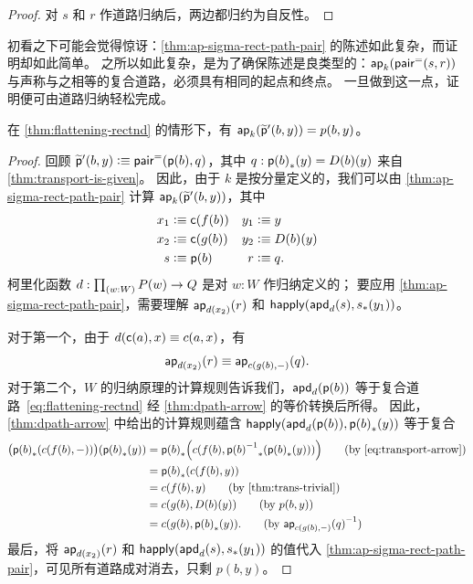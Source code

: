 \begin{proof}
  对 $s$ 和 $r$ 作道路归纳后，两边都归约为自反性。
\end{proof}

初看之下可能会觉得惊讶：\cref{thm:ap-sigma-rect-path-pair} 的陈述如此复杂，而证明却如此简单。
之所以如此复杂，是为了确保陈述是良类型的：$\mathsf{ap}_{k} (\mathsf{pair}^{\mathord{=}}(s,r))$ 与声称与之相等的复合道路，必须具有相同的起点和终点。
一旦做到这一点，证明便可由道路归纳轻松完成。

\begin{lem}\label{thm:flattening-rectnd-beta-ppt}
  在 \cref{thm:flattening-rectnd} 的情形下，有 $\mathsf{ap}_{k}(\widetilde{\mathsf{p}}'(b,y)) = p(b,y)$。
\end{lem}

\begin{proof}
  回顾 $\widetilde{\mathsf{p}}'(b,y) \vcentcolon\equiv \mathsf{pair}^{\mathord{=}}(\mathsf{p}(b),q)$，其中 $q:{\mathsf{p}(b)}_{*}\mathopen{}\left({y}\right)\mathclose{} = D(b)(y)$ 来自 \cref{thm:transport-is-given}。
  因此，由于 $k$ 是按分量定义的，我们可以由 \cref{thm:ap-sigma-rect-path-pair} 计算 $\mathsf{ap}_{k}(\widetilde{\mathsf{p}}'(b,y))$，其中
  \begin{align*}
    x_1 &\vcentcolon\equiv \mathsf{c}(f(b)) & y_1 &\vcentcolon\equiv y\\
    x_2 &\vcentcolon\equiv \mathsf{c}(g(b)) & y_2 &\vcentcolon\equiv D(b)(y)\\
    s &\vcentcolon\equiv \mathsf{p}(b)      &   r &\vcentcolon\equiv q.
  \end{align*}
  柯里化函数 $d:\prd{w:W} P(w) \to Q$ 是对 $w:W$ 作归纳定义的；
  要应用 \cref{thm:ap-sigma-rect-path-pair}，需要理解 $\mathsf{ap}_{d(x_2)}(r)$ 和 $\mathsf{happly}(\mathsf{apd}_{d}(s),{s}_{*}\mathopen{}\left({y_1}\right)\mathclose{})$。

  对于第一个，由于 $d(\mathsf{c}(a),x)\equiv c(a,x)$，有
  \[ \mathsf{ap}_{d(x_2)}(r) \equiv \mathsf{ap}_{c(g(b),-)}(q). \]
  对于第二个，$W$ 的归纳原理的计算规则告诉我们，$\mathsf{apd}_{d}(\mathsf{p}(b))$ 等于复合道路~\eqref{eq:flattening-rectnd} 经 \cref{thm:dpath-arrow} 的等价转换后所得。
  因此，\cref{thm:dpath-arrow} 中给出的计算规则蕴含 $\mathsf{happly}(\mathsf{apd}_{d}(\mathsf{p}(b)),{\mathsf{p}(b)}_{*}\mathopen{}\left({y}\right)\mathclose{})$ 等于复合
  \begin{align}
    \big(\trans{\pp(b)}{c(f(b),-)}\big)(\trans {\pp(b)}{y})
    &= \trans{\pp(b)}{c(f(b),\trans{\opp {\pp(b)}}{\trans {\pp(b)}{y}})}
    \tag{by~\eqref{eq:transport-arrow}}\\
    &= \trans{\pp(b)}{c(f(b),y)}
    \notag \\
    &= c(f(b),y)
    \tag{by \cref{thm:trans-trivial}}\\
    &= c(g(b),D(b)(y))
   \tag{by $p(b,y)$}\\
    &= c(g(b),\trans{\pp(b)}{y}).
    \tag{by $\opp{\apfunc{c(g(b),-)}(q)}$}
  \end{align}
  最后，将 $\mathsf{ap}_{d(x_2)}(r)$ 和 $\mathsf{happly}(\mathsf{apd}_{d}(s),{s}_{*}\mathopen{}\left({y_1}\right)\mathclose{})$ 的值代入 \cref{thm:ap-sigma-rect-path-pair}，可见所有道路成对消去，只剩 $p(b,y)$。
\end{proof}

